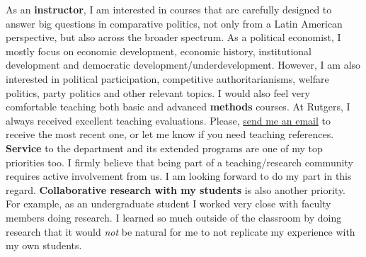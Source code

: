 \documentclass[10pt,stdletter,dateno,sigleft]{newlfm} %
\begin{document}
\begin{newlfm}


{\unskip}

As an {\bf instructor}, I am interested in courses that are carefully designed to answer big questions in comparative politics, not only from a Latin American perspective, but also across the broader spectrum. As a political economist, I mostly focus on economic development, economic history, institutional development and democratic development/underdevelopment. However, I am also interested in political participation, competitive authoritarianisms, welfare politics, party politics and other relevant topics. I would also feel very comfortable teaching both basic and advanced {\bf methods} courses. At Rutgers, I always received excellent teaching evaluations. Please, \href{mailto:\filetext}{send me an email} to receive the most recent one, or let me know if you need teaching references. {\bf Service} to the department and its extended programs are one of my top priorities too. I firmly believe that being part of a teaching/research community requires active involvement from us. I am looking forward to do my part in this regard. {\bf Collaborative research with my students} is also another priority. For example, as an undergraduate student I worked very close with faculty members doing research. I learned so much outside of the classroom by doing research that it would \emph{not} be natural for me to not replicate my experience with my own students. 



{\unskip}



\end{newlfm}
\end{document}
